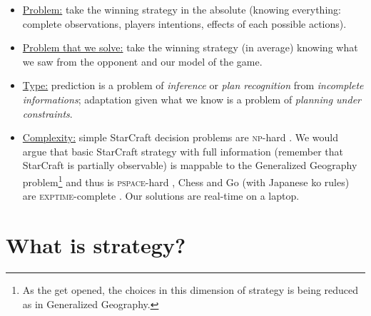 \begin{itemize}
\item \underline{Problem:} take the winning strategy in the absolute (knowing everything: complete observations, players intentions, effects of each possible actions).
\item \underline{Problem that we solve:} take the winning strategy (in average) knowing what we saw from the opponent and our model of the game. 
\item \underline{Type:} prediction is a problem of \textit{inference} or \textit{plan recognition} from \textit{incomplete informations}; adaptation given what we know is a problem of \textit{planning under constraints}.
\item \underline{Complexity:} simple StarCraft decision problems are \textsc{np}-hard \citep{GamingComplexity}. We would argue that basic StarCraft strategy with full information (remember that StarCraft is partially observable) is mappable to the Generalized Geography problem\footnote{As the  get opened, the choices in this dimension of strategy is being reduced as in Generalized Geography.} and thus is \textsc{pspace}-hard \citep{Lichtenstein78},
Chess \citep{Fraenkel81} and Go (with Japanese ko rules) are \textsc{exptime}-complete \citep{Robson83}. Our solutions are real-time on a laptop. %
\end{itemize}

\section{What is strategy?}
\label{sec:whatisstrategy}


